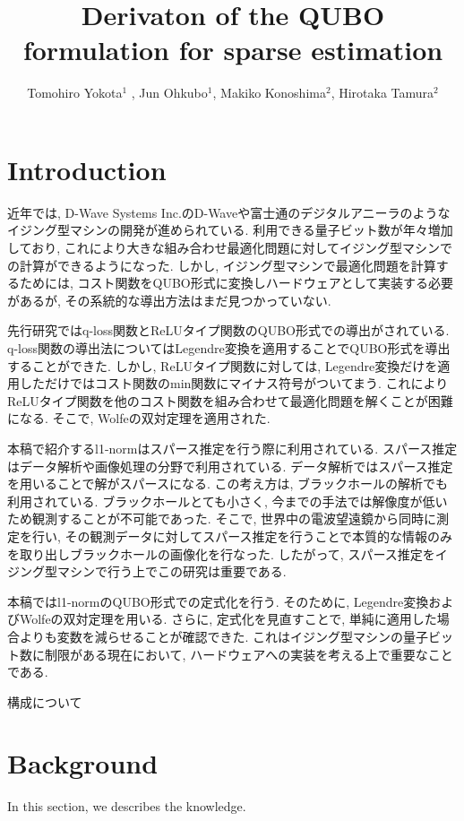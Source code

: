 \documentclass[fp,twocolumn]{jpsj3}
\title{Derivaton of the QUBO formulation for sparse estimation}
\author{Tomohiro Yokota$^1$%
  , Jun Ohkubo$^1$, Makiko Konoshima$^2$, Hirotaka Tamura$^2$}
\begin{document}
\maketitle

\section{Introduction}
近年では, D-Wave Systems Inc.のD-Waveや富士通のデジタルアニーラのようなイジング型マシンの開発が進められている. 利用できる量子ビット数が年々増加しており, これにより大きな組み合わせ最適化問題に対してイジング型マシンでの計算ができるようになった. しかし, イジング型マシンで最適化問題を計算するためには, コスト関数をQUBO形式に変換しハードウェアとして実装する必要があるが, その系統的な導出方法はまだ見つかっていない. 

先行研究ではq-loss関数とReLUタイプ関数のQUBO形式での導出がされている. q-loss関数の導出法についてはLegendre変換を適用することでQUBO形式を導出することができた. しかし, ReLUタイプ関数に対しては, Legendre変換だけを適用しただけではコスト関数のmin関数にマイナス符号がついてまう. これによりReLUタイプ関数を他のコスト関数を組み合わせて最適化問題を解くことが困難になる. そこで, Wolfeの双対定理を適用された. 

本稿で紹介するl1-normはスパース推定を行う際に利用されている. スパース推定はデータ解析や画像処理の分野で利用されている. データ解析ではスパース推定を用いることで解がスパースになる. この考え方は, ブラックホールの解析でも利用されている. ブラックホールとても小さく, 今までの手法では解像度が低いため観測することが不可能であった. そこで, 世界中の電波望遠鏡から同時に測定を行い, その観測データに対してスパース推定を行うことで本質的な情報のみを取り出しブラックホールの画像化を行なった. したがって, スパース推定をイジング型マシンで行う上でこの研究は重要である.

本稿ではl1-normのQUBO形式での定式化を行う. そのために, Legendre変換およびWolfeの双対定理を用いる. さらに, 定式化を見直すことで, 単純に適用した場合よりも変数を減らせることが確認できた. これはイジング型マシンの量子ビット数に制限がある現在において, ハードウェアへの実装を考える上で重要なことである. 

構成について

\section{Background}
In this section, we describes the knowledge.
\end{document}

